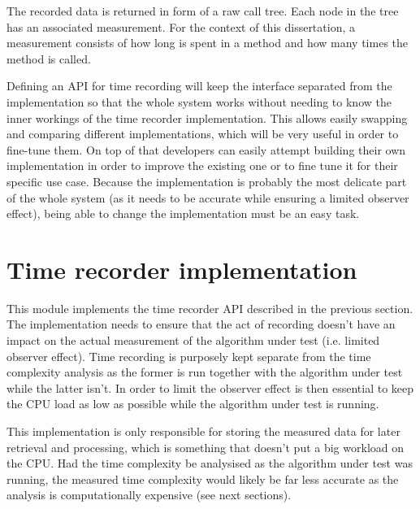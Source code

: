 \noindent The recorded data is returned in form of a raw call tree. Each node in the tree has an associated measurement. For the context of this dissertation, a measurement consists of how long is spent in a method and how many times the method is called.

\noindent Defining an API for time recording will keep the interface separated from the implementation so that the whole system works without needing to know the inner workings of the time recorder implementation. This allows easily swapping and comparing different implementations, which will be very useful in order to fine-tune them. On top of that developers can easily attempt building their own implementation in order to improve the existing one or to fine tune it for their specific use case. Because the implementation is probably the most delicate part of the whole system (as it needs to be accurate while ensuring a limited observer effect), being able to change the implementation must be an easy task.

\section{Time recorder implementation}
This module implements the time recorder API described in the previous section. The implementation needs to ensure that the act of recording doesn't have an impact on the actual measurement of the algorithm under test (i.e. limited observer effect). Time recording is purposely kept separate from the time complexity analysis as the former is run together with the algorithm under test while the latter isn't. In order to limit the observer effect is then essential to keep the CPU load as low as possible while the algorithm under test is running. 

\noindent This implementation is only responsible for storing the measured data for later retrieval and processing, which is something that doesn't put a big workload on the CPU. Had the time complexity be analysised as the algorithm under test was running, the measured time complexity would likely be far less accurate as the analysis is computationally expensive (see next sections).

